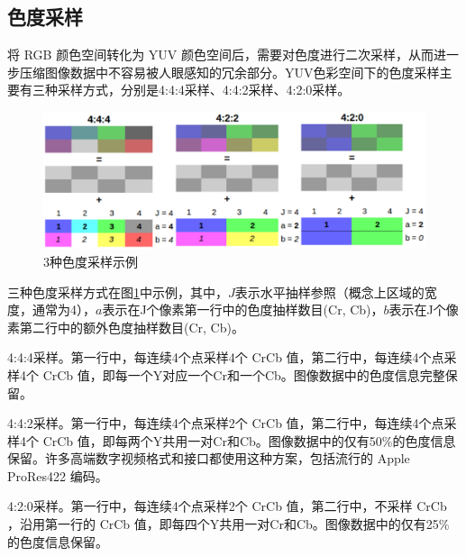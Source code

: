 \subsection{色度采样}
将 RGB 颜色空间转化为 YUV 颜色空间后，需要对色度进行二次采样，从而进一步压缩图像数据中不容易被人眼感知的冗余部分。YUV色彩空间下的色度采样主要有三种采样方式，分别是4:4:4采样、4:4:2采样、4:2:0采样。

\begin{figure}[ht]
    \centering
    \includegraphics[width=1.0\textwidth]{pages/jpeg/chrominance_sample.png}
    \caption{3种色度采样示例}
    \label{Fig.chrominance_sample}
\end{figure}

三种色度采样方式在图\ref{Fig.chrominance_sample}中示例，其中，$J$表示水平抽样参照（概念上区域的宽度，通常为4），$a$表示在J个像素第一行中的色度抽样数目(Cr, Cb)，$b$表示在J个像素第二行中的额外色度抽样数目(Cr, Cb)。

4:4:4采样。第一行中，每连续4个点采样4个 CrCb 值，第二行中，每连续4个点采样4个 CrCb 值，即每一个Y对应一个Cr和一个Cb。图像数据中的色度信息完整保留。

4:4:2采样。第一行中，每连续4个点采样2个 CrCb 值，第二行中，每连续4个点采样4个 CrCb 值，即每两个Y共用一对Cr和Cb。图像数据中的仅有50\%的色度信息保留。许多高端数字视频格式和接口都使用这种方案，包括流行的 Apple ProRes422 编码\cite{AppleproResWhiteBook}。

4:2:0采样。第一行中，每连续4个点采样2个 CrCb 值，第二行中，不采样 CrCb ，沿用第一行的 CrCb 值，即每四个Y共用一对Cr和Cb。图像数据中的仅有25\%的色度信息保留。

